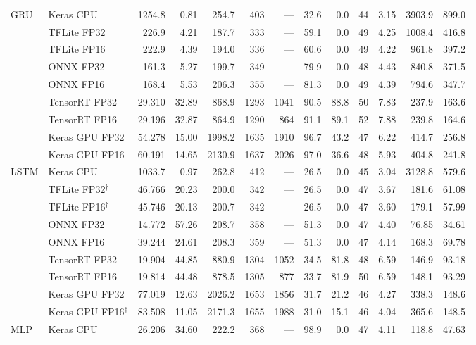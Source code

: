 \documentclass[11pt,a4paper]{article}
\begin{document}
\begin{table}[p]
{\begin{tabular}{@{}l l r r r r r r r r r r r@{}}
\midrule
\multirow{9}{*}{GRU} & Keras CPU & 1254.8 & 0.81 & 254.7 & 403 & --- & 32.6 & 0.0 & 44 & 3.15 & 3903.9 & 899.0 \\
 & TFLite FP32 & 226.9 & 4.21 & 187.7 & 333 & --- & 59.1 & 0.0 & 49 & 4.25 & 1008.4 & 416.8 \\
 & TFLite FP16 & 222.9 & 4.39 & 194.0 & 336 & --- & 60.6 & 0.0 & 49 & 4.22 & 961.8 & 397.2 \\
 & ONNX FP32 & 161.3 & 5.27 & 199.7 & 349 & --- & 79.9 & 0.0 & 48 & 4.43 & 840.8 & 371.5 \\
 & ONNX FP16 & 168.4 & 5.53 & 206.3 & 355 & --- & 81.3 & 0.0 & 49 & 4.39 & 794.6 & 347.7 \\
 & TensorRT FP32 & 29.310 & 32.89 & 868.9 & 1293 & 1041 & 90.5 & 88.8 & 50 & 7.83 & 237.9 & 163.6 \\
 & TensorRT FP16 & 29.196 & 32.87 & 864.9 & 1290 & 864 & 91.1 & 89.1 & 52 & 7.88 & 239.8 & 164.6 \\
 & Keras GPU FP32 & 54.278 & 15.00 & 1998.2 & 1635 & 1910 & 96.7 & 43.2 & 47 & 6.22 & 414.7 & 256.8 \\
 & Keras GPU FP16 & 60.191 & 14.65 & 2130.9 & 1637 & 2026 & 97.0 & 36.6 & 48 & 5.93 & 404.8 & 241.8 \\
\midrule
\multirow{9}{*}{LSTM} & Keras CPU & 1033.7 & 0.97 & 262.8 & 412 & --- & 26.5 & 0.0 & 45 & 3.04 & 3128.8 & 579.6 \\
 & TFLite FP32$^\dagger$ & 46.766 & 20.23 & 200.0 & 342 & --- & 26.5 & 0.0 & 47 & 3.67 & 181.6 & 61.08 \\
 & TFLite FP16$^\dagger$ & 45.746 & 20.13 & 200.7 & 342 & --- & 26.5 & 0.0 & 47 & 3.60 & 179.1 & 57.99 \\
 & ONNX FP32 & 14.772 & 57.26 & 208.7 & 358 & --- & 51.3 & 0.0 & 47 & 4.40 & 76.85 & 34.61 \\
 & ONNX FP16$^\dagger$ & 39.244 & 24.61 & 208.3 & 359 & --- & 51.3 & 0.0 & 47 & 4.14 & 168.3 & 69.78 \\
 & TensorRT FP32 & 19.904 & 44.85 & 880.9 & 1304 & 1052 & 34.5 & 81.8 & 48 & 6.59 & 146.9 & 93.18 \\
 & TensorRT FP16 & 19.814 & 44.48 & 878.5 & 1305 & 877 & 33.7 & 81.9 & 50 & 6.59 & 148.1 & 93.29 \\
 & Keras GPU FP32 & 77.019 & 12.63 & 2026.2 & 1653 & 1856 & 31.7 & 21.2 & 46 & 4.27 & 338.3 & 148.6 \\
 & Keras GPU FP16$^\dagger$ & 83.508 & 11.05 & 2171.3 & 1655 & 1988 & 31.0 & 15.1 & 46 & 4.04 & 365.6 & 148.5 \\
\midrule
\multirow{9}{*}{MLP} & Keras CPU & 26.206 & 34.60 & 222.2 & 368 & --- & 98.9 & 0.0 & 47 & 4.11 & 118.8 & 47.63 \\

\end{tabular}}
\end{table}
\end{document}

